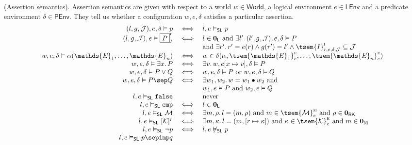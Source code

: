 \begin{defn}
	(Assertion semantics).
	Assertion semantics are given with respect to a world $w \in \mathsf{World}$, a logical environment $e \in \mathsf{LEnv}$ and a predicate environment $\delta \in \mathsf{PEnv}$. They tell us whether a configuration $w, e, \delta$ satisfies a particular assertion.
	\begingroup
	\renewcommand*{\arraystretch}{1.5}
	\[
	\begin{array}{r c l}
		(l, g, \mathcal{J}), e, \delta \vDash p
		&
		\iff
		&
		l, e \vDash_\mathsf{SL} p
	\\
		(l, g, \mathcal{J}), e \vDash \boxed{P}_I^r
		&
		\iff
		&
		l \in \mathbf{0}_\mathsf{L} \text{ and } \exists l' \ldotp (l', g, \mathcal{J}), e, \delta \vDash P
		\\ && \text{and } \exists r' \ldotp r' = e(r) \land g(r') = l' \land \tsem{I}^\textsc{i}_{r, e, \delta, \mathcal{J}} \subseteq \mathcal{J}
	\\
		w, e, \delta \vDash \alpha(\mathds{E}_1, \ldots, \mathds{E}_n)
		&
		\iff
		&
		w \in \delta(\alpha, \tsem{\mathds{E}_1}_e^\textsc{e}, \ldots, \tsem{\mathds{E}_n}_e^\textsc{e})
	\\
		w, e, \delta \vDash \exists x \ldotp P
		&
		\iff
		&
		\exists v \ldotp w, e[x \mapsto v], \delta \vDash P
	\\
		w, e, \delta \vDash P \lor Q
		&
		\iff
		&
		w, e, \delta \vDash P \text{ or } w, e, \delta \vDash Q
	\\
		w, e, \delta \vDash P \sep Q
		&
		\iff
		&
		\exists w_1, w_2 \ldotp w = w_1 \bullet w_2 \text{ and } \\ && w_1, e \vDash P \text{ and } w_2, e \vDash Q
	\\
		l, e \vDash_\mathsf{SL} \mathtt{false}
		&&
		\text{never}
	\\
		l, e \vDash_\mathsf{SL}  \mathtt{emp}
		&
		\iff
		&
		l \in \mathbf{0}_\mathsf{L}
	\\
		l, e \vDash_\mathsf{SL} \mathcal{M}
		&
		\iff
		&
		\exists m, \rho \ldotp l = (m, \rho) \text{ and } m \in \tsem{\mathcal{M}}_e^\textsc{m} \text{ and } \rho \in \mathbf{0}_\mathsf{RK}
	\\
		l, e \vDash_\mathsf{SL} [\mathcal{K}]^r
		&
		\iff
		&
		\exists m, \kappa \ldotp l = (m, [r \mapsto \kappa]) \text{ and } \kappa \in \tsem{\mathcal{K}}_e^\textsc{k} \text{ and } m \in \mathbf{0}_\mathbb{M}
	\\
		l, e \vDash_\mathsf{SL} \lnot p
		&
		\iff
		&
		l, e \not\vDash_\mathsf{SL} p
	\\
		l, e \vDash_\mathsf{SL} p \sepimp q

\end{array}\]
\end{defn}
